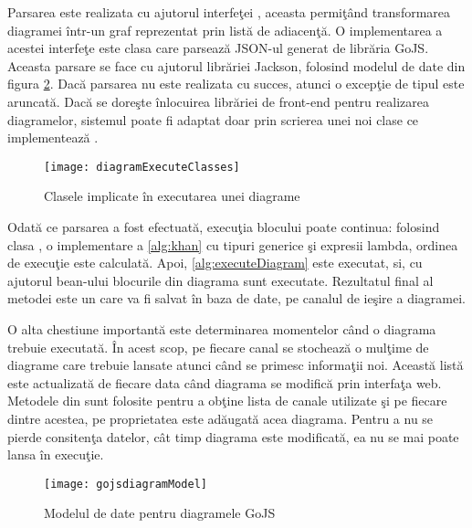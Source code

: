 Parsarea este realizata cu ajutorul interfeţei , aceasta permiţând transformarea diagramei într-un graf reprezentat prin listă de adiacenţă. O implementarea a acestei interfeţe este clasa  care parsează JSON-ul generat de librăria GoJS. Aceasta parsare se face cu ajutorul librăriei Jackson, folosind modelul de date din figura \cref{fig:gojsdiagramModel}. Dacă parsarea nu este realizata cu succes, atunci o excepţie de tipul  este aruncată.
Dacă se doreşte înlocuirea librăriei de front-end pentru realizarea diagramelor, sistemul poate fi adaptat doar prin scrierea unei noi clase ce implementează .

\begin{figure}[H]
	\centering
	\texttt{[image: diagramExecuteClasses]}
	\caption{Clasele implicate în executarea unei diagrame}
	\label{fig:diagramExecuteClasses}
\end{figure}
Odată ce parsarea a fost efectuată, execuţia blocului poate continua: folosind clasa , o implementare a \cref{alg:khan} cu tipuri generice şi expresii lambda, ordinea de execuţie este calculată. Apoi, \cref{alg:executeDiagram} este executat, si, cu ajutorul bean-ului  blocurile din diagrama sunt executate. Rezultatul final al metodei  este un  care va fi salvat în baza de date, pe canalul de ieşire a diagramei.

O alta chestiune importantă este determinarea momentelor când o diagrama trebuie executată. În acest scop, pe fiecare canal se stochează o mulţime de diagrame care trebuie lansate atunci când se primesc informaţii noi. Această listă este actualizată de fiecare data când diagrama se modifică prin interfaţa web. Metodele din  sunt folosite pentru a obţine lista de canale utilizate şi pe fiecare dintre acestea, pe proprietatea  este adăugată acea diagrama. Pentru a nu se pierde consitenţa datelor, cât timp diagrama este modificată, ea nu se mai poate lansa în execuţie.
\begin{figure}[H]
	\centering
	\texttt{[image: gojsdiagramModel]}
	\caption{Modelul de date pentru diagramele GoJS}
	\label{fig:gojsdiagramModel}
\end{figure}

